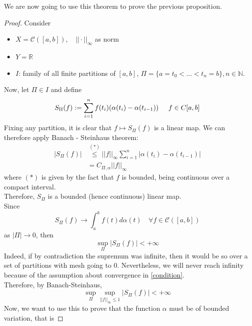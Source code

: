    We are now going to use this theorem to prove the previous proposition. 
    \begin{proof}
    Consider 
    \begin{itemize}
        \item $X = \mathcal{C}([a,b]), \quad || \cdot || _{\infty}$ as norm 
        \item $Y = \mathbb{R}$
        \item $I$: family of all finite partitions of $[a,b]$, $\Pi = \{a = t_0 < \ldots < t_n = b\}, n \in \mathbb{N}$. 
    \end{itemize}
    Now, let $\Pi \in I$ and define
    \begin{equation*}
       S_\Pi(f) := \sum_{i=1}^n f(t_i) (\alpha(t_i)-\alpha(t_{i-1})) \hspace{0,5 cm} f \in C[a,b]
    \end{equation*}
    Fixing any partition, it is clear that $f \mapsto S_\Pi(f)$ is a linear map. We can therefore apply Banach - Steinhaus theorem:
    \begin{align*}
        |S_\Pi(f)| &\stackrel{(*)}\leq ||f||_{\infty} \sum_{i=1}^n |\alpha(t_i)-\alpha(t_{i-1})| \\ 
        &= C_{\Pi, \alpha} ||f||_{\infty}
    \end{align*}
    where $(*)$ is given by the fact that $f$ is bounded, being continuous over a compact interval. \\
    Therefore, $S_\Pi$ is a bounded (hence continuous) linear map.\\
    Since 
    \begin{equation}
    \label{condition}
        S_\Pi(f) \rightarrow \int_a^b f(t) d\alpha(t) \quad \forall f \in \mathcal{C}([a,b])
    \end{equation}
    as $|\Pi| \rightarrow 0$, then 
    \begin{equation*}
       \sup_\Pi |S_\Pi(f)| < + \infty
    \end{equation*}
    Indeed, if by contradiction the supremum was infinite, then it would be so over a set of partitions with mesh going to $0$. Nevertheless, we will never reach infinity because of the assumption about convergence in \eqref{condition}.\\
    Therefore, by Banach-Steinhaus,
    \begin{equation*}
        \sup_\Pi \sup_{||f||_\infty \leq 1} |S_\Pi(f)|<+ \infty
    \end{equation*}
    Now, we want to use this to prove that the function $\alpha$ must be of bounded variation, that is 

\end{proof}

